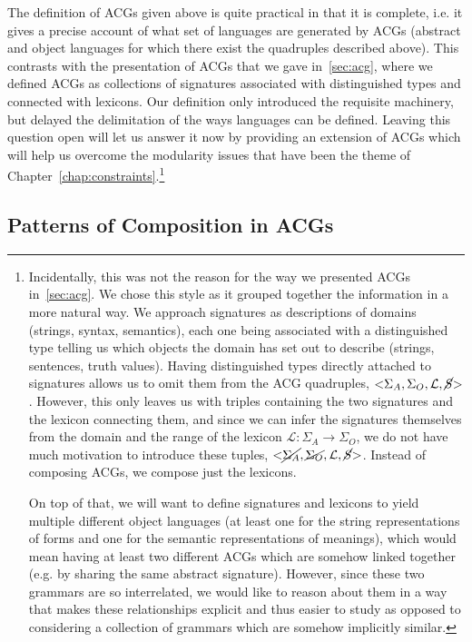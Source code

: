 The definition of ACGs given above is quite practical in that it is
complete, i.e. it gives a precise account of what set of languages are
generated by ACGs (abstract and object languages for which there exist
the quadruples described above). This contrasts with the presentation of
ACGs that we gave in~\ref{sec:acg}, where we defined ACGs as collections
of signatures associated with distinguished types and connected with
lexicons. Our definition only introduced the requisite machinery, but
delayed the delimitation of the ways languages can be defined. Leaving
this question open will let us answer it now by providing an extension
of ACGs which will help us overcome the modularity issues that have been
the theme of Chapter~\ref{chap:constraints}.\footnote{Incidentally, this
  was not the reason for the way we presented ACGs in~\ref{sec:acg}. We
  chose this style as it grouped together the information in a more
  natural way. We approach signatures as descriptions of domains
  (strings, syntax, semantics), each one being associated with a
  distinguished type telling us which objects the domain has set out to
  describe (strings, sentences, truth values). Having distinguished
  types directly attached to signatures allows us to omit them from the
  ACG quadruples, $\mathopen{<}\Sigma_A, \Sigma_O, \mathcal{L},
  \cancel{S}\mathclose{>}$. However, this only leaves us with triples
  containing the two signatures and the lexicon connecting them, and
  since we can infer the signatures themselves from the domain and the
  range of the lexicon $\mathcal{L} : \Sigma_A \to \Sigma_O$, we do not
  have much motivation to introduce these tuples,
  $\mathopen{<}\cancel{\Sigma_A}, \cancel{\Sigma_O}, \mathcal{L},
  \cancel{S}\mathclose{>}$. Instead of composing ACGs, we compose just
  the lexicons.

On top of that, we will want to define signatures and lexicons to yield
multiple different object languages (at least one for the string
representations of forms and one for the semantic representations of
meanings), which would mean having at least two different ACGs which are
somehow linked together (e.g. by sharing the same abstract
signature). However, since these two grammars are so interrelated, we
would like to reason about them in a way that makes these relationships
explicit and thus easier to study as opposed to considering a collection
of grammars which are somehow implicitly similar.}

\subsection{Patterns of Composition in ACGs}
\label{ssec:acg-patterns}

